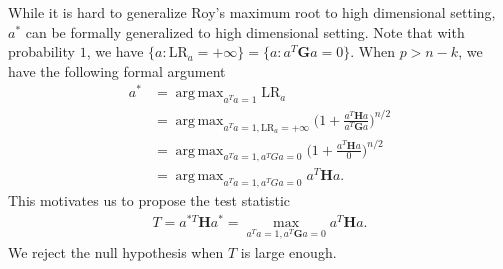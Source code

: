 \documentclass[12pt]{article} %
\DeclareMathOperator*{\argmax}{arg\,max}
\newcommand{\bH}{\mathbf{H}}
\newcommand{\bG}{\mathbf{G}}
\theoremstyle{definition}
\begin{document}
While it is hard to generalize Roy's maximum root to high dimensional setting, $a^*$ can be formally generalized to high dimensional setting.
Note that with probability $1$, we have $\{a:\text{LR}_a=+\infty\}=\{a:a^T \bG a=0\}$. When $p>n-k$, we have the following formal argument
$$
\begin{aligned}
    a^*&=\argmax_{a^T a=1} \text{LR}_{a}\\
    &=\argmax_{a^T a=1,\text{LR}_a=+\infty} \Big(1+\frac{a^T \bH a}{a^T \bG a}\Big)^{n/2}\\
    &=\argmax_{a^T a=1,a^T Ga=0} \Big(1+\frac{a^T \bH a}{0}\Big)^{n/2}\\
    &=\argmax_{a^T a=1,a^T Ga=0} {a^T \bH a}.
\end{aligned}
$$
This motivates us to propose the test statistic
\begin{equation*}
    \begin{aligned}
        T=a^{*T} \bH a^*
        =
        \max_{a^T a=1, a^T \bG a=0} 
        a^T \bH a.
    \end{aligned}
\end{equation*}
We reject the null hypothesis when $T$ is large enough.
\end{document}
